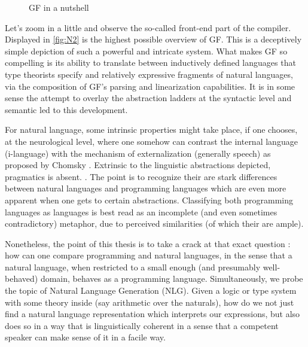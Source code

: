 \begin{figure}
\centering
{}
\caption{GF in a nutshell} \label{fig:N2}
\end{figure}

Let's zoom in a little and observe the so-called front-end part of the compiler.
Displayed in \autoref{fig:N2} is the highest possible overview of GF. This is a
deceptively simple depiction of such a powerful and intricate system. What makes
GF so compelling is its ability to translate between inductively defined
languages that type theorists specify and relatively expressive fragments of
natural languages, via the composition of GF's parsing and linearization
capabilities. It is in some sense the attempt to overlay the abstraction ladders
at the syntactic level and semantic led to this development.

For natural language, some intrinsic properties might take place, if one
chooses, at the neurological level, where one somehow can contrast the internal
language (i-language) with the mechanism of externalization (generally speech) as proposed by
Chomsky \cite{Chomsky1995}. Extrinsic to the linguistic abstractions depicted, pragmatics is
absent.
.
The point is to recognize their are stark differences between natural languages
and programming languages which are even more apparent when one gets to certain
abstractions. Classifying both programming languages as
languages is best read as an incomplete (and even sometimes contradictory)
metaphor, due to perceived similarities (of which their are ample).

Nonetheless, the point of this thesis is to take a crack at that exact question
: how can one compare programming and natural languages, in the sense that a
natural language, when restricted to a small enough (and presumably
well-behaved) domain, behaves as a programming language. Simultaneously, we
probe the topic of Natural Language Generation (NLG). Given a
logic or type system with some theory inside (say arithmetic over the naturals),
how do we not just find a natural language representation which interprets our
expressions, but also does so in a way that is linguistically coherent in a
sense that a competent speaker can make sense of it in a facile way.

